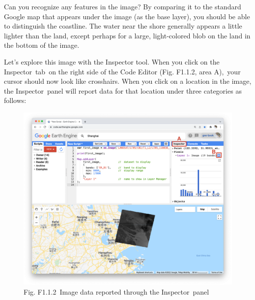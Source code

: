 \documentclass[
  letterpaper,
  DIV=11,
  numbers=noendperiod]{scrreprt}
\begin{document}
Can you recognize any features in the image? By comparing it to the
standard Google map that appears under the image (as the base layer),
you should be able to distinguish the coastline. The water near the
shore generally appears a little lighter than the land, except perhaps
for a large, light-colored blob on the land in the bottom of the image.

Let's explore this image with the Inspector tool. When you click on the
Inspector~tab~on the right side of the Code Editor (Fig. F1.1.2, area
A),~your cursor should now look like crosshairs. When you click on a
location in the image, the Inspector~panel will report data for that
location under three categories as follows: ~

\begin{figure}

{\centering \includegraphics{./F1/image69.png}

}

\caption{Fig. F1.1.2~Image data reported through the Inspector~panel}

\end{figure}
\end{document}
